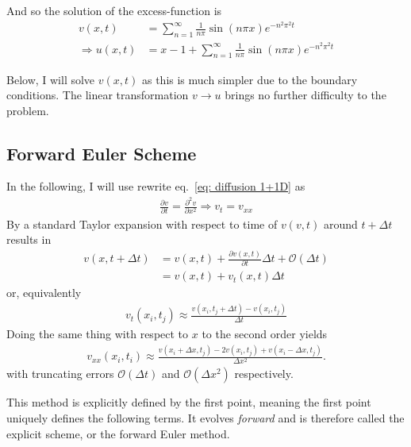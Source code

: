 \documentclass[twoside, 11pt]{article}
\begin{document}
		And so the solution of the excess-function is
		\begin{align*}
			v(x, t) &= \sum_{n=1}^\infty \frac{1}{n\pi} \sin(n\pi x) e^{-n^2\pi^2t} \\
			\Rightarrow u(x, t) &=  x - 1 + \sum_{n=1}^\infty \frac{1}{n\pi} \sin(n\pi x) e^{-n^2\pi^2t}
		\end{align*}
		
		Below, I will solve $v(x, t)$ as this is much simpler due to the boundary conditions. The linear transformation $v\rightarrow u$ brings no further difficulty to the problem.
		
	\subsection{Forward Euler Scheme}
		In the following, I will use rewrite eq.~\eqref{eq: diffusion 1+1D} as
		\begin{align*}
			\frac{\partial v}{\partial t} = \frac{\partial^2v}{\partial x^2} \Rightarrow v_t = v_{xx}
		\end{align*}
		By a standard Taylor expansion with respect to time of $v(v, t)$ around $t+\Delta t$ results in
		\begin{align*}
			v(x, t+\Delta t) &= v(x, t) + \frac{\partial v(x, t)}{\partial t}\Delta t + \mathcal{O}(\Delta t) \\
			&= v(x, t) + v_t(x, t)\Delta t
		\end{align*}
		or, equivalently
		\begin{align*}
			v_t(x_i, t_j) \approx \frac{v(x_i, t_j + \Delta t) - v(x_i, t_j)}{\Delta t}
		\end{align*}
		Doing the same thing with respect to $x$ to the second order yields
		\begin{align*}
			v_{xx}(x_i, t_i) \approx \frac{v(x_i + \Delta x, t_j) - 2v(x_i, t_j) + v(x_i - \Delta x, t_j)}{\Delta x^2}.
		\end{align*}
		with truncating errors $\mathcal{O}(\Delta t)$ and $\mathcal{O}(\Delta x^2)$ respectively.
		
		This method is explicitly defined by the first point, meaning the first point uniquely defines the following terms. It evolves \textit{forward} and is therefore called the explicit scheme, or the forward Euler method. 
		
\end{document}
